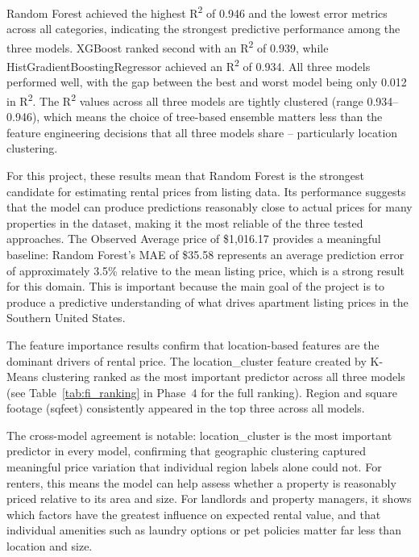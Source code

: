 \noindent
Random Forest achieved the highest R\textsuperscript{2} of 0.946 and the lowest error metrics across all categories, indicating the strongest predictive performance among the three models. XGBoost ranked second with an R\textsuperscript{2} of 0.939, while HistGradientBoostingRegressor achieved an R\textsuperscript{2} of 0.934. All three models performed well, with the gap between the best and worst model being only 0.012 in R\textsuperscript{2}. The R\textsuperscript{2} values across all three models are tightly clustered (range 0.934--0.946), which means the choice of tree-based ensemble matters less than the feature engineering decisions that all three models share -- particularly location clustering.

\noindent
For this project, these results mean that Random Forest is the strongest candidate for estimating rental prices from listing data. Its performance suggests that the model can produce predictions reasonably close to actual prices for many properties in the dataset, making it the most reliable of the three tested approaches. The Observed Average price of \$1,016.17 provides a meaningful baseline: Random Forest's MAE of \$35.58 represents an average prediction error of approximately 3.5\% relative to the mean listing price, which is a strong result for this domain. This is important because the main goal of the project is to produce a predictive understanding of what drives apartment listing prices in the Southern United States.

\noindent
The feature importance results confirm that location-based features are the dominant drivers of rental price. The location\_cluster feature created by K-Means clustering ranked as the most important predictor across all three models (see Table~\ref{tab:fi_ranking} in Phase~4 for the full ranking). Region and square footage (sqfeet) consistently appeared in the top three across all models.

\noindent
The cross-model agreement is notable: location\_cluster is the most important predictor in every model, confirming that geographic clustering captured meaningful price variation that individual region labels alone could not. For renters, this means the model can help assess whether a property is reasonably priced relative to its area and size. For landlords and property managers, it shows which factors have the greatest influence on expected rental value, and that individual amenities such as laundry options or pet policies matter far less than location and size.

